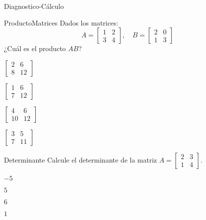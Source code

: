 \documentclass[a4,11pt]{aleph-notas}
\begin{document}
\begin{quiz}{Diagnostico-Cálculo}

\begin{multi}[]
    {ProductoMatrices}
    Dados los matrices:
    \[
    A = \begin{bmatrix} 1 & 2 \\ 3 & 4 \end{bmatrix}, \quad B = \begin{bmatrix} 2 & 0 \\ 1 & 3 \end{bmatrix}
    \]
    ¿Cuál es el producto \( AB \)?
    \item \( \begin{bmatrix} 2 & 6 \\ 8 & 12 \end{bmatrix} \)
    \item \( \begin{bmatrix} 1 & 6 \\ 7 & 12 \end{bmatrix} \)
    \item* \( \begin{bmatrix} 4 & 6 \\ 10 & 12 \end{bmatrix} \)
    \item \( \begin{bmatrix} 3 & 5 \\ 7 & 11 \end{bmatrix} \)
\end{multi}

\begin{multi}[]
    {Determinante}
    Calcule el determinante de la matriz \( A = \begin{bmatrix} 2 & 3 \\ 1 & 4 \end{bmatrix} \).
    \item \( -5 \)
    \item* \( 5 \)
    \item \( 6 \)
    \item \( 1 \)
\end{multi}


\end{quiz}
\end{document}

